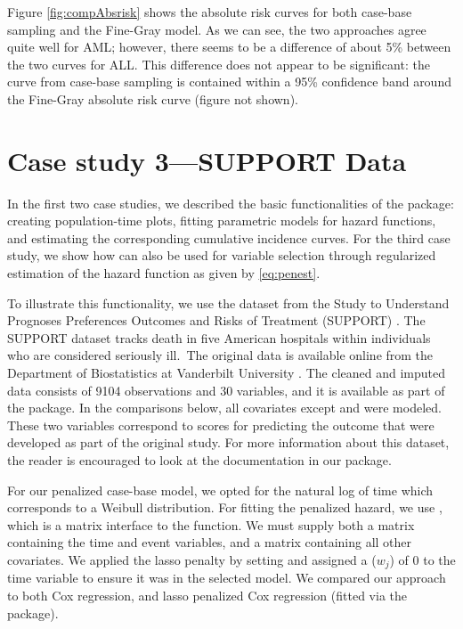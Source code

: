 \documentclass[
]{jss}
\begin{document}
Figure \ref{fig:compAbsrisk} shows the absolute risk curves for both
case-base sampling and the Fine-Gray model. As we can see, the two
approaches agree quite well for AML; however, there seems to be a
difference of about 5\% between the two curves for ALL. This difference
does not appear to be significant: the curve from case-base sampling is
contained within a 95\% confidence band around the Fine-Gray absolute
risk curve (figure not shown).

\hypertarget{case-study-3support-data}{%
\section{Case study 3---SUPPORT Data}\label{case-study-3support-data}}

In the first two case studies, we described the basic functionalities of
the  package: creating population-time plots, fitting
parametric models for hazard functions, and estimating the corresponding
cumulative incidence curves. For the third case study, we show how
 can also be used for variable selection through
regularized estimation of the hazard function as given by
\eqref{eq:penest}.

To illustrate this functionality, we use the dataset from the Study to
Understand Prognoses Preferences Outcomes and Risks of Treatment
(SUPPORT) \citep{knaus1995support}. The SUPPORT dataset tracks death in
five American hospitals within individuals who are considered seriously
ill.~The original data is available online from the Department of
Biostatistics at Vanderbilt University \citep{harrell_2020}. The cleaned
and imputed data consists of 9104 observations and 30 variables, and it
is available as part of the  package. In the comparisons
below, all covariates except  and  were modeled.
These two variables correspond to scores for predicting the outcome that
were developed as part of the original study. For more information about
this dataset, the reader is encouraged to look at the documentation in
our package.

For our penalized case-base model, we opted for the natural log of time
which corresponds to a Weibull distribution. For fitting the penalized
hazard, we use , which is a matrix interface
to the  function. We must supply both a matrix
 containing the time and event variables, and a matrix 
containing all other covariates. We applied the lasso penalty by setting
 and assigned a  (\(w_j\)) of 0 to
the time variable to ensure it was in the selected model. We compared
our approach to both Cox regression, and lasso penalized Cox regression
(fitted via the  package).
\end{document}
